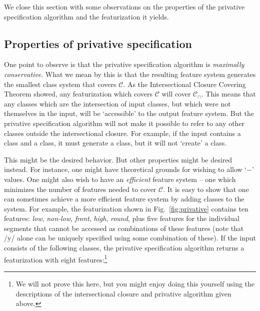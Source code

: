 \documentclass[11pt, oneside]{article}   	%
\begin{document}
We close this section with some observations on the properties of the privative specification algorithm and the featurization it yields. 

\subsection{Properties of privative specification}
\label{sec:priv_props}

One point to observe is that the privative specification algorithm is \textit{maximally conservative}. What we mean by this is that the resulting feature system generates the smallest class system that covers $\mathcal C$. As the Intersectional Closure Covering Theorem showed, any featurization which covers $\mathcal C$ will cover $\mathcal C_\cap$. This means that any classes which are the intersection of input classes, but which were not themselves in the input, will be `accessible' to the output feature system. But the privative specification algorithm will not make it possible to refer to any other classes outside the intersectional closure. For example, if the input contains a  class and a  class, it must generate a  class, but it will not `create' a  class.

This might be the desired behavior. But other properties might be desired instead. For instance, one might have theoretical grounds for wishing to allow `$-$' values. One might also wish to have an \textit{efficient} feature system -- one which minimizes the number of features needed to cover $\mathcal C$. It is easy to show that one can sometimes achieve a more efficient feature system by adding classes to the system. For example, the featurization shown in Fig.~\ref{fig:privative} contains ten features: \textit{low}, \textit{non-low}, \textit{front}, \textit{high}, \textit{round}, plus five features for the individual segments that cannot be accessed as combinations of these features (note that /y/ alone can be uniquely specified using some combination of these). If the input consists of the following classes, the privative specification algorithm returns a featurization with eight features:\footnote{We will not prove this here, but you might enjoy doing this yourself using the descriptions of the intersectional closure and privative algorithm given above.}
\end{document}

